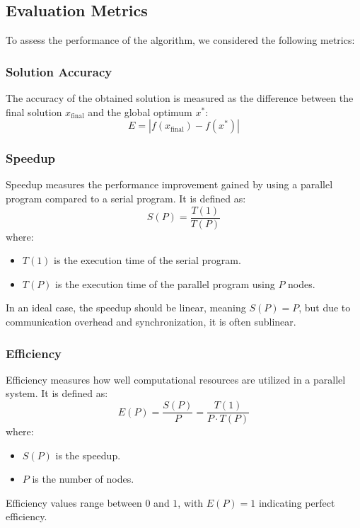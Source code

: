 \subsection{Evaluation Metrics}
To assess the performance of the algorithm, we considered the following metrics:

\subsubsection{Solution Accuracy}
The accuracy of the obtained solution is measured as the difference between the final solution \( x_{\text{final}} \) and the global optimum \( x^* \):
\begin{equation}
    E = | f(x_{\text{final}}) - f(x^*) |
\end{equation}

\subsubsection{Speedup}
Speedup measures the performance improvement gained by using a parallel program compared to a serial program. It is defined as:
\begin{equation}
    S(P) = \frac{T(1)}{T(P)}
\end{equation}
where:
\begin{itemize}
    \item \( T(1) \) is the execution time of the serial program.
    \item \( T(P) \) is the execution time of the parallel program using \(P\) nodes.
\end{itemize}
In an ideal case, the speedup should be linear, meaning \( S(P) = P \), but due to communication overhead and synchronization, it is often sublinear.

\subsubsection{Efficiency}
Efficiency measures how well computational resources are utilized in a parallel system. It is defined as:
\begin{equation}
    E(P) = \frac{S(P)}{P} = \frac{T(1)}{P \cdot T(P)}
\end{equation}
where:
\begin{itemize}
    \item \( S(P) \) is the speedup.
    \item \( P \) is the number of nodes.
\end{itemize}
Efficiency values range between \( 0 \) and \( 1 \), with \( E(P) = 1 \) indicating perfect efficiency.

